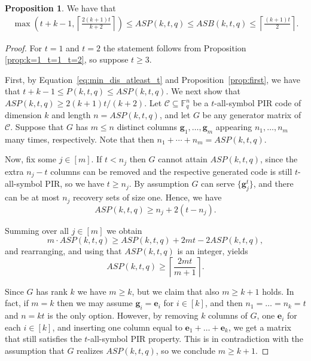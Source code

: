 \documentclass[11pt,a4paper]{article}
\theoremstyle{definition}
\newtheorem{proposition}[theorem]{Proposition}
\newcommand{\bfe}{{\boldsymbol e}}
\newcommand{\bfg}{{\boldsymbol g}}
\newcommand{\F}{\mathbb{F}}
\begin{document}
\begin{proposition} \label{prop:lbub}
    We have that
    \begin{align*}
        \max(t + k - 1,\left\lceil \frac{2(k+1)t}{k+2} \right\rceil) \le ASP(k,t,q) \le ASB(k,t,q) \le  \left\lceil \frac{(k+1)t}{2} \right\rceil.
    \end{align*}
\end{proposition}
\begin{proof}

    For $t = 1$ and $t = 2$ the statement follows from Proposition \ref{prop:k=1_t=1_t=2}, so suppose $t \geq 3$. 
    
    First, by Equation~\eqref{eq:min_dis_atleast_t} and Proposition~\ref{prop:first}, we have that $t + k - 1\le P(k,t,q)\le ASP(k,t,q)$. We next show that $ASP(k,t,q) \geq {2(k+1)t}/{(k+2)}$. Let $\mathcal{C}\subseteq \F_q^n$ be a $t$-all-symbol PIR code of dimension $k$ and length $n = ASP(k,t,q)$, and let $G$ be any generator matrix of $\mathcal{C}$. Suppose that $G$ has $m \leq n$ distinct columns $\bfg_1, \dots, \bfg_{m}$ appearing $n_1, \dots, n_{m}$ many times, respectively. Note that then $n_1 + \cdots + n_m = ASP(k,t,q)$. 
    
    Now, fix some $j \in [m]$. If $t < n_j$ then $G$ cannot attain $ASP(k,t,q)$, since the extra $n_j-t$ columns can be removed and the respective generated code is still $t$-all-symbol PIR, so we have $t \geq n_j$. By assumption $G$ can serve $\{\bfg_j^t\}$, and there can be at most $n_j$ recovery sets of size one. Hence, we have
    $$
        ASP(k,t,q) \geq n_j + 2(t - n_j).
    $$

    Summing over all $j \in [m]$ we obtain
    $$
        m\cdot ASP(k,t,q) \geq ASP(k,t,q)  + 2mt - 2ASP(k,t,q),
    $$
    and rearranging, and using that $ASP(k,t,q)$ is an integer, yields
    $$
        ASP(k,t,q) \geq \left\lceil \frac{2mt}{m+1}\right\rceil.
    $$ 

    Since $G$ has rank $k$ we have $m \geq k$, but we claim that also $m \geq k+1$ holds. In fact, if $m = k$ then we may assume $\bfg_i = \bfe_i$ for $i \in [k]$, and then $n_1 = \dots= n_k = t$ and $n = kt$ is the only option. However, by removing $k$ columns of $G$, one $\bfe_i$ for each $i \in [k]$, and inserting one column equal to $\bfe_1 + \dots + \bfe_k$, we get a matrix that still satisfies the $t$-all-symbol PIR property. This is in contradiction with the assumption that $G$ realizes $ASP(k,t,q)$, so we conclude $m \geq k+1$. 


\end{proof}
\end{document}

